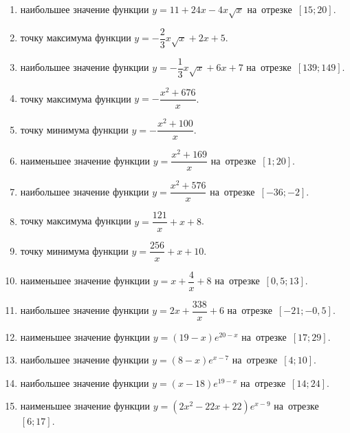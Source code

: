 \documentclass[a4paper,10pt]{article}
\begin{document}
\begin{enumerate}
\item {} наибольшее значение функции $y=11+24x -4x\sqrt{x}$ на~отрезке~$\left[15;20\right]$.

\item {} точку максимума функции $y=-\dfrac{2}{3}x\sqrt{x} +2x+5$.

\item {} наибольшее значение функции $y=-\dfrac{1}{3}x\sqrt{x} +6x+7$ на~отрезке~$\left[139;149\right]$.

\item {} точку максимума функции $y=-\dfrac{x^2 +676}{x}$.

\item {} точку минимума функции $y=-\dfrac{x^2 +100}{x}$.

\item {} наименьшее значение функции $y=\dfrac{x^2 +169}{x}$ на~отрезке~$\left[1;20\right]$.

\item {} наибольшее значение функции $y=\dfrac{x^2 +576}{x}$ на~отрезке~$\left[-36;-2\right]$.

\item {} точку максимума функции $y=\dfrac{121}{x} +x+8$.

\item {} точку минимума функции $y=\dfrac{256}{x} +x+10$.

\item {} наименьшее значение функции $y=x+\dfrac{4}{x} +8$ на~отрезке~$\left[0,5;13\right]$.

\item {} наибольшее значение функции $y=2x+\dfrac{338}{x} +6$ на~отрезке~$\left[-21;-0,5\right]$.

\item {} наименьшее значение функции $y=\left(19-x\right)e^{20-x}$ на~отрезке~$\left[17;29\right]$.

\item {} наибольшее значение функции $y=\left(8-x\right)e^{x-7}$ на~отрезке~$\left[4;10\right]$.

\item {} наибольшее значение функции $y=\left(x-18\right)e^{19-x}$ на~отрезке~$\left[14;24\right]$.

\item {} наименьшее значение функции $y=\left(2x^2 -22x +22\right)e^{x -9}$ на~отрезке~$\left[6;17\right]$.


\end{enumerate}
\end{document}
